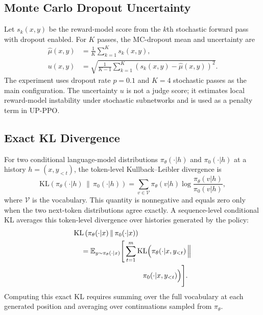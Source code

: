 \documentclass[11pt]{article}
\newcommand{\kl}{\mathrm{KL}}
\begin{document}
\subsection{Monte Carlo Dropout Uncertainty}
Let $s_k(x,y)$ be the reward-model score from the $k$th stochastic forward pass with dropout enabled. For $K$ passes, the MC-dropout mean and uncertainty are
\begin{align}
    \hat{\mu}(x,y)&=\frac{1}{K}\sum_{k=1}^{K}s_k(x,y),\\
    u(x,y)&=\sqrt{\frac{1}{K-1}\sum_{k=1}^{K}\left(s_k(x,y)-\hat{\mu}(x,y)\right)^2}.
\end{align}
The experiment uses dropout rate $p=0.1$ and $K=4$ stochastic passes as the main configuration. The uncertainty $u$ is not a judge score; it estimates local reward-model instability under stochastic subnetworks and is used as a penalty term in UP-PPO.

\subsection{Exact KL Divergence}
For two conditional language-model distributions $\pi_\theta(\cdot|h)$ and $\pi_0(\cdot|h)$ at a history $h=(x,y_{<t})$, the token-level Kullback--Leibler divergence is
\begin{equation}
    \kl\left(\pi_\theta(\cdot|h)\,\|\,\pi_0(\cdot|h)\right)
    =\sum_{v\in\mathcal{V}}\pi_\theta(v|h)
    \log\frac{\pi_\theta(v|h)}{\pi_0(v|h)},
\end{equation}
where $\mathcal{V}$ is the vocabulary. This quantity is nonnegative and equals zero only when the two next-token distributions agree exactly. A sequence-level conditional KL averages this token-level divergence over histories generated by the policy:
\begin{equation}
\begin{aligned}
    &\kl\left(\pi_\theta(\cdot|x)\,\|\,\pi_0(\cdot|x)\right) \\
    &\quad =\mathbb{E}_{y\sim\pi_\theta(\cdot|x)}
    \Bigg[\sum_{t=1}^{m}
    \kl\Big(\pi_\theta(\cdot|x,y_{<t})\,\Big\| \\
    &\hspace{34mm} \pi_0(\cdot|x,y_{<t})\Big)\Bigg].
\end{aligned}
\end{equation}
Computing this exact KL requires summing over the full vocabulary at each generated position and averaging over continuations sampled from $\pi_\theta$.
\end{document}
